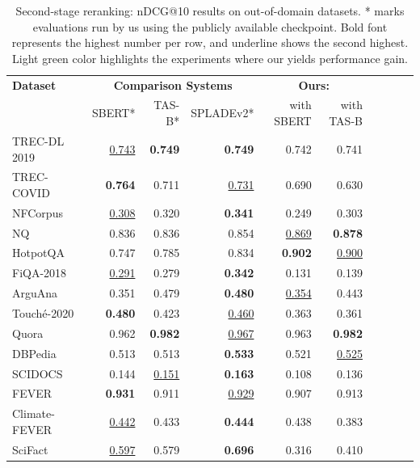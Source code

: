 \documentclass{article}
\begin{document}
\begin{table}[tb!] 
    \caption{Second-stage reranking: nDCG@10 results on out-of-domain datasets. * marks evaluations run by us using the publicly available checkpoint. Bold font represents the highest number per row, and underline shows the second highest. Light green color highlights the experiments where our \alg{} yields performance gain.} 
    \vspace{5pt}
    \centering \small
    \begin{tabular}{l r r r r r r r r r }
        \toprule
        \textbf{Dataset} & \multicolumn{3}{c}{\textbf{Comparison Systems}} & \multicolumn{2}{c}{\textbf{Ours: \alg{}}} \\
            & SBERT* & TAS-B* & SPLADEv2* & with SBERT & with TAS-B   \\ 
        \midrule
TREC-DL 2019 & \underline{0.743} & \textbf{0.749} & \textbf{0.749} & 0.742 & 0.741\\
TREC-COVID & \textbf{0.764} & 0.711 & \underline{0.731} & 0.690 & 0.630\\
NFCorpus & \underline{0.308} & 0.320 & \textbf{0.341} & 0.249 & 0.303\\
NQ & 0.836 & 0.836 & 0.854 & \cellcolor{lightgreen}\underline{0.869} & \cellcolor{lightgreen}\textbf{0.878}\\
HotpotQA & 0.747 & 0.785 & 0.834 & \cellcolor{lightgreen}\textbf{0.902} & \cellcolor{lightgreen}\underline{0.900}\\
FiQA-2018 & \underline{0.291} & 0.279 & \textbf{0.342} & 0.131 & 0.139\\
ArguAna & 0.351 & 0.479 & \textbf{0.480} & \cellcolor{lightgreen}\underline{0.354} & 0.443\\
Touché-2020 & \textbf{0.480} & 0.423 & \underline{0.460} & 0.363 & 0.361\\
Quora & 0.962 & \textbf{0.982} & \underline{0.967} & \cellcolor{lightgreen}0.963 & \cellcolor{lightgreen}\textbf{0.982}\\
DBPedia & 0.513 & 0.513 & \textbf{0.533} & \cellcolor{lightgreen}0.521 & \cellcolor{lightgreen}\underline{0.525}\\
SCIDOCS & 0.144 & \underline{0.151} & \textbf{0.163} & 0.108 & 0.136\\
FEVER & \textbf{0.931} & 0.911 & \underline{0.929} & 0.907 & \cellcolor{lightgreen}0.913\\
Climate-FEVER & \underline{0.442} & 0.433 & \textbf{0.444} & 0.438 & 0.383\\
SciFact & \underline{0.597} & 0.579 & \textbf{0.696} & 0.316 & 0.410\\
        \bottomrule
    \end{tabular}
    \vspace{-8pt}
    \label{tab:eval_rerank_out-of-domain}
\end{table}
\end{document}
